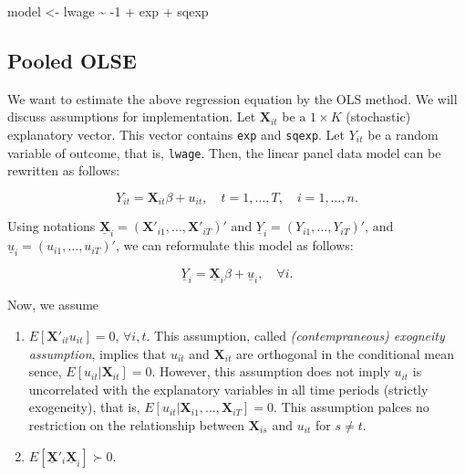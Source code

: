 \documentclass[
  12pt,
]{article}
\newenvironment{Shaded}{\begin{snugshade}}{\end{snugshade}}
\newcommand{\DecValTok}[1]{\textcolor[rgb]{0.00,0.00,0.81}{#1}}
\newcommand{\NormalTok}[1]{#1}
\newcommand{\OtherTok}[1]{\textcolor[rgb]{0.56,0.35,0.01}{#1}}
\newcommand{\SpecialCharTok}[1]{\textcolor[rgb]{0.00,0.00,0.00}{#1}}
\providecommand{\tightlist}{%
  \setlength{\itemsep}{0pt}\setlength{\parskip}{0pt}}
\begin{document}
\begin{Shaded}
\begin{Highlighting}[]
\NormalTok{model }\OtherTok{\textless{}{-}}\NormalTok{ lwage }\SpecialCharTok{\textasciitilde{}} \SpecialCharTok{{-}}\DecValTok{1} \SpecialCharTok{+}\NormalTok{ exp }\SpecialCharTok{+}\NormalTok{ sqexp}
\end{Highlighting}
\end{Shaded}

\hypertarget{pooled-olse}{%
\subsection{Pooled OLSE}\label{pooled-olse}}

We want to estimate the above regression equation by the OLS method. We
will discuss assumptions for implementation. Let \(\mathbf{X}_{it}\) be
a \(1 \times K\) (stochastic) explanatory vector. This vector contains
\texttt{exp} and \texttt{sqexp}. Let \(Y_{it}\) be a random variable of
outcome, that is, \texttt{lwage}. Then, the linear panel data model can
be rewritten as follows:

\[
  Y_{it} = \mathbf{X}_{it} \beta + u_{it}, \quad t = 1, \ldots, T, \quad i = 1, \ldots, n.
\]

Using notations
\(\underline{\mathbf{X}}_i = (\mathbf{X}'_{i1}, \ldots, \mathbf{X}'_{iT})'\)
and \(\underline{Y}_i = (Y_{i1}, \ldots, Y_{iT})'\), and
\(\underline{u}_i = (u_{i1}, \ldots, u_{iT})'\), we can reformulate this
model as follows:

\[
  \underline{Y}_i = \underline{\mathbf{X}}_i \beta + \underline{u}_i, \quad \forall i.
\]

Now, we assume

\begin{enumerate}
\def\labelenumi{\arabic{enumi}.}
\tightlist
\item
  \(E[\mathbf{X}'_{it}u_{it}] = 0\), \(\forall i, t\). This assumption,
  called \emph{(contempraneous) exogneity assumption}, implies that
  \(u_{it}\) and \(\mathbf{X}_{it}\) are orthogonal in the conditional
  mean sence, \(E[u_{it} | \mathbf{X}_{it}] = 0\). However, this
  assumption does not imply \(u_{it}\) is uncorrelated with the
  explanatory variables in all time periods (strictly exogeneity), that
  is, \(E[u_{it} | \mathbf{X}_{i1}, \ldots, \mathbf{X}_{iT}] = 0\). This
  assumption palces no restriction on the relationship between
  \(\mathbf{X}_{is}\) and \(u_{it}\) for \(s\not=t\).
\item
  \(E[\underline{\mathbf{X}}'_i\underline{\mathbf{X}}_i] \succ 0\).
\end{enumerate}
\end{document}
